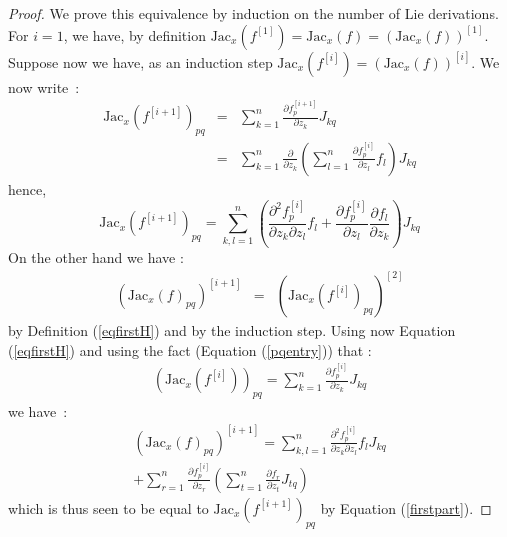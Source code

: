 \documentclass{sig-alternate-05-2015} %
\begin{document}
\begin{proof}
We prove this equivalence by induction on the number of Lie derivations. 
For $i=1$, we have, by definition $\mbox{Jac}_x(f^{[1]})
=\mbox{Jac}_x(f)=(\mbox{Jac}_x(f))^{[1]}$. Suppose now we have, as an induction
step $\mbox{Jac}_x(f^{[i]})=(\mbox{Jac}_x(f))^{[i]}$. We now write~:
$$\begin{array}{rcl}
\mbox{Jac}_x(f^{[i+1]})_{pq} & = & \sum\limits_{k=1}^n \frac{\partial f^{[i+1]}_p}{\partial z_k} J_{kq} \\
 & = & \sum\limits_{k=1}^n \frac{\partial}{\partial z_k} \left(
\sum\limits_{l=1}^n \frac{\partial{f^{[i]}_p}}{\partial z_l} f_l
\right)J_{kq}
\end{array}$$
\noindent hence, 
\begin{equation}
\mbox{Jac}_x(f^{[i+1]})_{pq} =  \sum\limits_{k,l=1}^n \left(\frac{\partial^2 f_p^{[i]}}{\partial z_k \partial z_l} f_l
+\frac{\partial f_p^{[i]}}{\partial z_l}\frac{\partial f_l}{\partial z_k}\right)
J_{kq}
\label{firstpart}
\end{equation}
On the other hand we have : 
$$\begin{array}{rcl}
(\mbox{Jac}_x(f)_{pq})^{[i+1]} & = &
(\mbox{Jac}_x(f^{[i]})_{pq})^{[2]}
\end{array}$$
\noindent by Definition (\ref{eqfirstH}) and by the induction step. 
Using now Equation (\ref{eqfirstH}) and using the fact (Equation (\ref{pqentry})) that :
$$\begin{array}{rcl}
(\mbox{Jac}_x(f^{[i]}))_{pq} = \sum\limits_{k=1}^n \frac{\partial f^{[i]}_p}{\partial z_k} J_{kq}
\end{array}$$
\noindent we have~:  
\begin{multline}
(\mbox{Jac}_x(f)_{pq})^{[i+1]}  = 
\sum\limits_{k,l=1}^n \frac{\partial^2 f_p^{[i]}}{\partial z_k \partial z_l} f_l J_{kq} \\
+ \sum\limits_{r=1}^n \frac{\partial f_p^{[i]}}{\partial z_r}\left(\sum\limits_{t=1}^n
\frac{\partial f_r}{\partial z_t} J_{tq} \right)
\end{multline}
\noindent which is thus seen to be equal to $\mbox{Jac}_x(f^{[i+1]})_{pq}$ by
Equation (\ref{firstpart}). 
\end{proof}
\end{document}
